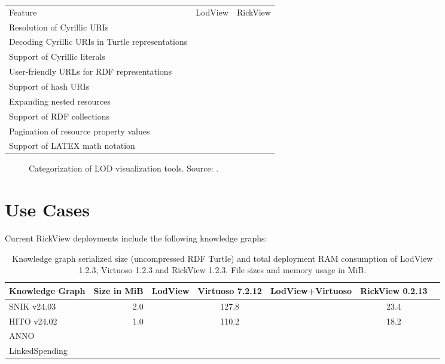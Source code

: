 \documentclass{ceurart}
\begin{document}
\begin{tabular}{lll}
\toprule
Feature												&LodView	&RickView\\
Resolution of Cyrillic URIs							&\\
Decoding Cyrillic URIs in Turtle representations	&\\
Support of Cyrillic literals						&\\
User-friendly URLs for RDF representations			&&\\
Support of hash URIs			&&\\
Expanding nested resources			&&\\
Support of RDF collections			&&\\
Pagination of resource property values			&&\\
Support of LATEX math notation			&&\\
\midrule
\bottomrule
\end{tabular}



\begin{figure}
\centering
\caption{Categorization of LOD visualization tools. Source: \cite{adaptinglodview}.}
\label{fig:relatedwork}
\end{figure}

\section{Use Cases}
Current RickView deployments include the following knowledge graphs:

\begin{table}
\begin{tabular}{lrSSSSS}
\toprule
Knowledge Graph	&\textnormal{Size in MiB}	&\textnormal{LodView}	&\textnormal{Virtuoso 7.2.12}	&\textnormal{LodView+Virtuoso}	&\textnormal{RickView 0.2.13}\\
\midrule
SNIK v24.03		&2.0						&						&127.8							&								&23.4\\
HITO v24.02		&1.0						&						&110.2							&								&18.2\\
ANNO			&\\
LinkedSpending	&\\
\bottomrule
\end{tabular}
\label{tab:stats}
\caption{Knowledge graph serialized size (uncompressed RDF Turtle) and total deployment RAM consumption of LodView 1.2.3, Virtuoso 1.2.3 and RickView 1.2.3.
File sizes and memory usage in MiB.}
\end{table}
\end{document}
